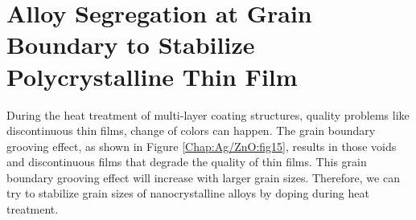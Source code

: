 \section{Alloy Segregation at Grain Boundary to Stabilize Polycrystalline Thin Film}
\label{Chap:Ag/ZnO:GB}



During the heat treatment of multi-layer coating structures, quality problems like discontinuous thin films, change of colors can happen. The grain boundary grooving effect, as shown in Figure \ref{Chap:Ag/ZnO:fig15}, results in those voids and discontinuous films that degrade the quality of thin films. \cite{mullins1957theory,simrick2012thermal} This grain boundary grooving effect will increase with larger grain sizes. \cite{martin2009thermal} Therefore, we can try to stabilize grain sizes of nanocrystalline alloys by doping during heat treatment. \cite{chookajorn2012design,jiao2018nanocrystalline}


